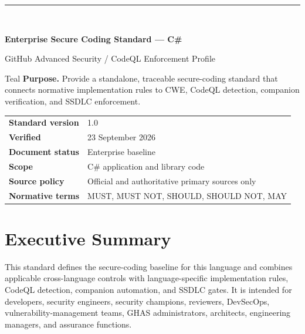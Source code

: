 \documentclass[10pt,letterpaper]{article}
\begin{document}
\fancyhead[L]{\textcolor{Muted}{Enterprise Secure Coding Standard --- C\#}}
\fancyhead[R]{\textcolor{Muted}{v1.0 --- 23 September 2026}}
\hypersetup{pageanchor=false}
\begin{titlepage}
\thispagestyle{empty}
\vspace*{0.85in}
{\color{Teal}\rule{1.2in}{3pt}}\\[0.32in]
{\Huge\bfseries\color{Navy}Enterprise Secure Coding Standard --- C\#\par}
\vspace{0.18in}
{\Large\color{Teal}GitHub Advanced Security / CodeQL Enforcement Profile\par}
\vspace{0.55in}
\begin{callout}{Teal}
\textbf{Purpose.} Provide a standalone, traceable secure-coding standard that connects normative implementation rules to CWE, CodeQL detection, companion verification, and SSDLC enforcement.
\end{callout}
\vfill
\begin{tabular}{@{}ll@{}}
\textbf{Standard version} & 1.0 \\
\textbf{Verified} & 23 September 2026 \\
\textbf{Document status} & Enterprise baseline \\
\textbf{Scope} & C\# application and library code \\
\textbf{Source policy} & Official and authoritative primary sources only \\
\textbf{Normative terms} & MUST, MUST NOT, SHOULD, SHOULD NOT, MAY \\
\end{tabular}
\vspace{0.55in}
\end{titlepage}
\hypersetup{pageanchor=true}
\tableofcontents
\clearpage
{}

\section{Executive Summary}
This standard defines the secure-coding baseline for this language and combines applicable cross-language controls with language-specific implementation rules, CodeQL detection, companion automation, and SSDLC gates. It is intended for developers, security engineers, security champions, reviewers, DevSecOps, vulnerability-management teams, GHAS administrators, architects, engineering managers, and assurance functions.
\end{document}
